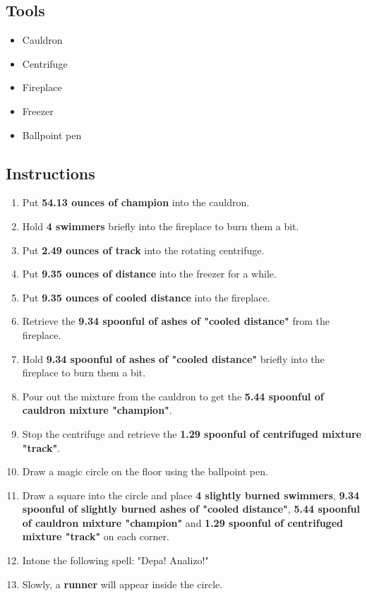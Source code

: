 \documentclass{article}
\begin{document}
\subsection{Tools}\begin{itemize}
\item 
Cauldron
\item 
Centrifuge
\item 
Fireplace
\item 
Freezer
\item 
Ballpoint pen
\end{itemize}
\subsection{Instructions}\begin{enumerate}
\item 
Put \textbf{54.13 ounces of champion} into the cauldron.
\item 
Hold \textbf{4 swimmers} briefly into the fireplace to burn them a bit.
\item 
Put \textbf{2.49 ounces of track} into the rotating centrifuge.
\item 
Put \textbf{9.35 ounces of distance} into the freezer for a while.
\item 
Put \textbf{9.35 ounces of cooled distance} into the fireplace.
\item 
Retrieve the \textbf{9.34 spoonful of ashes of "cooled distance"} from the fireplace.
\item 
Hold \textbf{9.34 spoonful of ashes of "cooled distance"} briefly into the fireplace to burn them a bit.
\item 
Pour out the mixture from the cauldron to get the \textbf{5.44 spoonful of cauldron mixture "champion"}.
\item 
Stop the centrifuge and retrieve the \textbf{1.29 spoonful of centrifuged mixture "track"}.
\item 
Draw a magic circle on the floor using the ballpoint pen.
\item 
Draw a square into the circle and place \textbf{4 slightly burned swimmers}, \textbf{9.34 spoonful of slightly burned ashes of "cooled distance"}, \textbf{5.44 spoonful of cauldron mixture "champion"} and \textbf{1.29 spoonful of centrifuged mixture "track"} on each corner.
\item 
Intone the following spell: "Depa! Analizo!"
\item 
Slowly, a \textbf{runner} will appear inside the circle.
\end{enumerate}
\newpage
\end{document}

